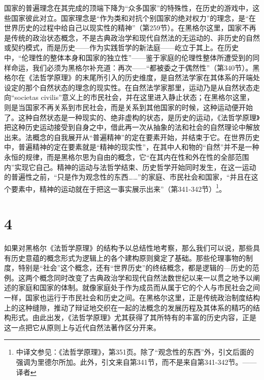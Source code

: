 国家的普遍理念在其完成的顶端下降为“众多国家”的特殊性，在历史的游戏中，这些国家彼此对立。国家理念是“作为类和对抗个别国家的绝对权力”的理念，是“在世界历史的过程中给自己以现实性的精神”（第259节）。在黑格尔这里，国家不再是传统的政治状态概念，不是古典政治学和现代自然法的无运动的、非历史的自然或契约模式，而是历史——作为实践哲学的新法庭——屹立于其上。在历史中，“伦理性的整体本身和国家的独立性”——鉴于家庭的伦理性整体所遭受到的同样命运，我们必须为黑格尔补充道：再次——“都被委之于偶然性”（第340节）。黑格尔在《法哲学原理》的末尾所引入的历史维度，是自然法学家在其体系的开端处设定的那个自然状态的理念的现实性。在自然法学家那里，运动乃是从自然状态走向“societas civilis”意义上的市民社会，并在这里进入静止状态；在黑格尔这里，则是当国家不再关系到市民社会，而是关系到其他国家的时候，这种运动便开始了。这种自然状态是一种现实的、绝非虚构的状态，是历史的运动，《法哲学原理》把这种历史运动接受到自身之中，借此再一次从抽象的法和社会的自然理论中解放出来。法概念的自我展开从“普遍精神”的定在要素开始，并结束于它。在世界历史中，普遍精神的定在要素就是“精神的现实性”，在其中人和物的“自然”并不是一种永恒的规律，而是黑格尔思为自由的概念，它“在其内在性和外在性的全部范围内”实现它自己。精神的运动与法哲学结束、历史哲学开始同时发生，在这一运动的普遍性之前，“只是作为观念性的东西……”的家庭、市民社会和国家，“并且在这个要素中，精神的运动就在于把这一事实展示出来”（第341-342节）\footnote{中译文参见：《法哲学原理》，第351页。除了“观念性的东西”外，引文后面的强调为里德尔所加。此外，引文来自第341节，而不是来自第341-342节。——译者}。

\section*{4}

如果对黑格尔《法哲学原理》的结构予以总结性地考察，那么我们可以说，那些具有历史意蕴的概念形式为逻辑上的各个建构原则奠定了基础。那些伦理事物的制度，特别是“社会”这个概念，还有“世界历史”的终结概念，都是逻辑的—历史的范例。这两个概念同时改变了古典政治学和现代自然法数世纪以来一以贯之地予以阐述的家庭和国家的体制。就像家庭处于作为成员而从属于它的个人与市民社会之间一样，国家也运行于市民社会和历史之间。在黑格尔这里，正是传统政治制度结构上的这种缝隙，推动了辩证地交织在一起的法概念的发展历程及其体系的精巧的结构形式。由此出发，《法哲学原理》尤其获得了其所特有的丰富的历史内容，正是这一点把它从原则上与近代自然法著作区分开来。

